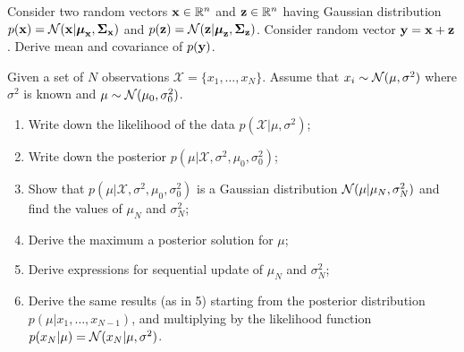 \documentclass{../amsml}
\begin{document}




\begin{problem}
Consider two random vectors $\bm{\mathbf{x}} \in {\mathbb R}^n$ and $\bm{\mathbf{z}} \in {\mathbb R}^n$ having Gaussian distribution  $p(\bm{\mathbf{x}}) = \mathcal{N}(\bm{\mathbf{x}} | \bm{\mathbf{\mu}}_{\bm{\mathbf{x}}}, \bm{\mathbf{\Sigma}}_{\bm{\mathbf{x}}})$ and  $p(\bm{\mathbf{z}}) = \mathcal{N}(\bm{\mathbf{z}} | \bm{\mathbf{\mu}}_{\bm{\mathbf{z}}}, \bm{\mathbf{\Sigma}}_{\bm{\mathbf{z}}})$.  Consider random vector $\bm{\mathbf{y}} = \bm{\mathbf{x}} + \bm{\mathbf{z}}$. Derive mean and covariance of $p(\bm{\mathbf{y}})$.

\end{problem}

\begin{problem}
Given a set of $N$ observations $\mathcal{X} = \{x_1,\dots,x_N\}$. Assume that $x_i \sim \mathcal{N}(\mu,\sigma^2)$ where $\sigma^2$ is known and $\mu \sim \mathcal{N}(\mu_0,\sigma_0^2)$. 
\begin{enumerate}
\item Write down the likelihood of the data $p(\mathcal{X}|\mu,\sigma^2)$;
\item Write down the posterior $p(\mu|\mathcal{X},\sigma^2, \mu_0,\sigma_0^2)$;
\item Show that $p(\mu|\mathcal{X},\sigma^2, \mu_0,\sigma_0^2)$ is a Gaussian distribution $\mathcal{N}(\mu|\mu_N,\sigma_N^2)$ and find the values of $\mu_N$ and $\sigma_N^2$;
\item Derive the maximum a posterior solution for $\mu$;
\item Derive expressions for sequential update of $\mu_N$ and $\sigma_N^2$;
\item Derive the same results (as in 5) starting from the posterior distribution $p(\mu|x_1,\dots,x_{N-1})$, and multiplying by the likelihood function $p(x_N |\mu) = \mathcal{N}(x_N |\mu,\sigma^2)$.
\end{enumerate}
\end{problem}
\end{document}
